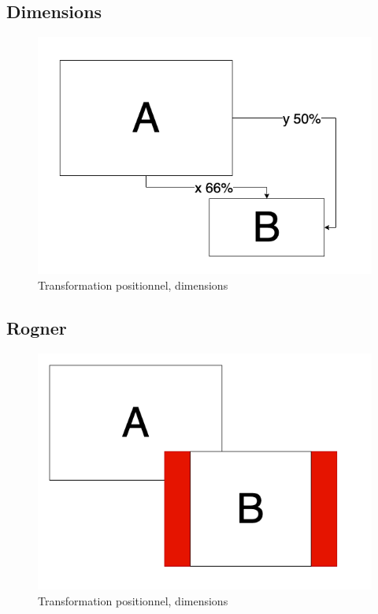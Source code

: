 \documentclass[
  french,
]{book}
\begin{document}
\hypertarget{dimensions}{%
\subsection{Dimensions}\label{dimensions}}

\begin{figure}
\centering
\includegraphics{medias/traiter/figures/dia_transfogeo_dimensions.png}
\caption{Transformation positionnel, dimensions}
\end{figure}

\hypertarget{rogner}{%
\subsection{Rogner}\label{rogner}}

\begin{figure}
\centering
\includegraphics{medias/traiter/figures/dia_transfogeo_rogner.png}
\caption{Transformation positionnel, dimensions}
\end{figure}
\end{document}
